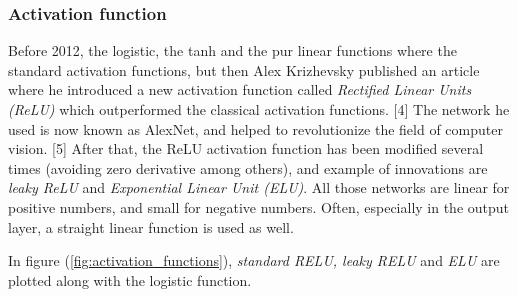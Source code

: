 \subsubsection{Activation function}
Before 2012, the logistic, the tanh and the pur linear functions where the standard activation functions, but then Alex Krizhevsky published an article where he introduced a new activation function called \textit{Rectified Linear Units (ReLU)} which outperformed the classical activation functions. [4] The network he used is now known as AlexNet, and helped to revolutionize the field of computer vision. [5] After that, the ReLU activation function has been modified several times (avoiding zero derivative among others), and example of innovations are \textit{leaky ReLU} and \textit{Exponential Linear Unit (ELU)}. All those networks are linear for positive numbers, and small for negative numbers. Often, especially in the output layer, a straight linear function is used as well.

In figure (\ref{fig:activation_functions}), \textit{standard RELU, leaky RELU} and \textit{ELU} are plotted along with the logistic function.

